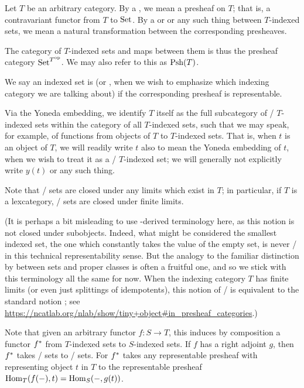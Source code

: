Let $T$ be an arbitrary category. By a , we mean a presheaf on $T$; that is, a contravariant functor from $T$ to $\mathrm{Set}$. By a  or  or any such thing between $T$-indexed sets, we mean a natural transformation between the corresponding presheaves.

The category of $T$-indexed sets and maps between them is thus the presheaf category $\mathrm{Set}^{T^{\mathrm{op}}}$. We may also refer to this as $\operatorname{Psh}(T)$.

We say an indexed set is  (or , when we wish to emphasize which indexing category we are talking about) if the corresponding presheaf is representable. 

Via the Yoneda embedding, we identify $T$ itself as the full subcategory of \repsmall/ $T$-indexed sets within the category of all $T$-indexed sets, such that we may speak, for example, of functions from objects of $T$ to $T$-indexed sets. That is, when $t$ is an object of $T$, we will readily write $t$ also to mean the Yoneda embedding of $t$, when we wish to treat it as a \repsmall/ $T$-indexed set; we will generally not explicitly write $y(t)$ or any such thing.

Note that \repsmall/ sets are closed under any limits which exist in $T$; in particular, if $T$ is a lexcategory, \repsmall/ sets are closed under finite limits.

(It is perhaps a bit misleading to use -derived terminology here, as this notion is not closed under subobjects. Indeed, what might be considered the smallest indexed set, the one which constantly takes the value of the empty set, is never \repsmall/ in this technical representability sense. But the analogy to the familiar distinction by between  sets and proper classes is often a fruitful one, and so we stick with this terminology all the same for now. When the indexing category $T$ has finite limits (or even just splittings of idempotents), this notion of \repsmall/ is equivalent to the standard notion ; see \url{https://ncatlab.org/nlab/show/tiny+object#in_presheaf_categories}.)

Note that given an arbitrary functor $f : S \to T$, this induces by composition a functor $f^*$ from $T$-indexed sets to $S$-indexed sets. If $f$ has a right adjoint $g$, then $f^*$ takes \repsmall/ sets to \repsmall/ sets. For $f^*$ takes any representable presheaf with representing object $t$ in $T$ to the representable presheaf $\operatorname{Hom}_T(f(-), t) = \operatorname{Hom}_S(-, g(t))$.

